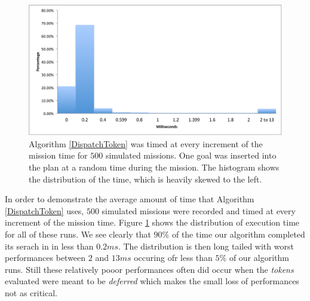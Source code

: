 \begin{figure}[!htbp]
  \centering
  \includegraphics[width=\columnwidth]{figs/HistogramAlg1}
  \caption{\small Algorithm \ref{DispatchToken} was 
  timed at every increment of the mission time for $500$ 
  simulated missions. One goal was inserted into the plan 
  at a random time during the mission. The histogram shows 
  the distribution of the time, which is heavily skewed to the left.}
  \label{fig:histogram}
\end{figure}

In order to demonstrate the average amount of time that Algorithm
\ref{DispatchToken} uses, $500$ simulated missions were recorded and
timed at every increment of the mission time. Figure
\ref{fig:histogram} shows the distribution of execution time for all
of these runs. We see clearly that $90\%$ of the time our algorithm
completed its serach in in less than $0.2 ms$. The distribution is
then long tailed with worst performances between $2$ and $13ms$
occuring ofr less than $5\%$ of our algorithm runs. Still these
relatively pooor performances often did occur when the {\em tokens}
evaluated were meant to be {\em deferred} which makes the small loss
of performances not as critical.


